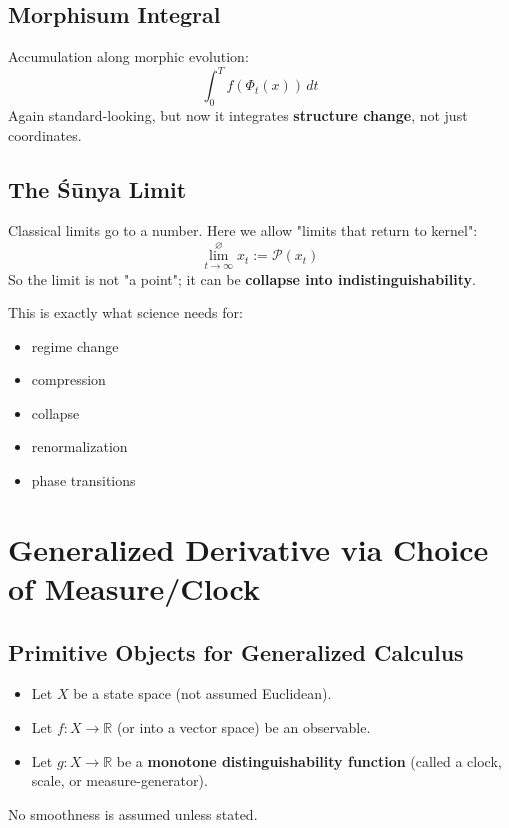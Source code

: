\documentclass[12pt, oneside]{article}
\begin{document}
\subsection{Morphisum Integral}

Accumulation along morphic evolution:
\begin{equation}
\int_0^T f(\Phi_t(x)) \, dt
\end{equation}
Again standard-looking, but now it integrates \textbf{structure change}, not just coordinates.

\subsection{The Śūnya Limit}

Classical limits go to a number. Here we allow "limits that return to kernel":
\begin{equation}
\overset{\varnothing}{\lim_{t \to \infty}} x_t := \mathcal{P}(x_t)
\end{equation}
So the limit is not "a point"; it can be \textbf{collapse into indistinguishability}.

This is exactly what science needs for:
\begin{itemize}
    \item regime change
    \item compression
    \item collapse
    \item renormalization
    \item phase transitions
\end{itemize}

\section{Generalized Derivative via Choice of Measure/Clock}

\subsection{Primitive Objects for Generalized Calculus}

\begin{itemize}
    \item Let $X$ be a state space (not assumed Euclidean).
    \item Let $f: X \rightarrow \mathbb{R}$ (or into a vector space) be an observable.
    \item Let $g: X \rightarrow \mathbb{R}$ be a \textbf{monotone distinguishability function} (called a clock, scale, or measure-generator).
\end{itemize}
No smoothness is assumed unless stated.
\end{document}
